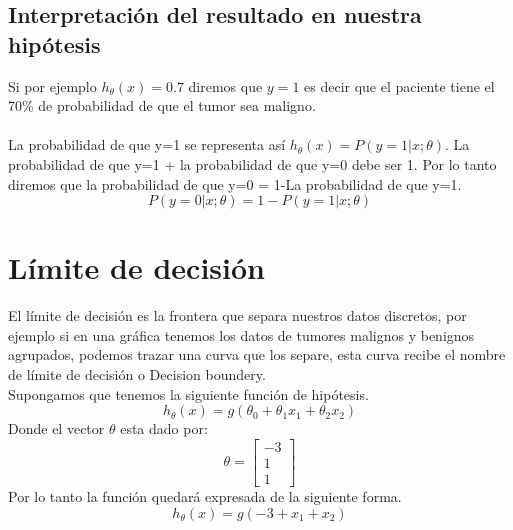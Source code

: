 \documentclass{report}
\begin{document}
\subsection{Interpretación del resultado en nuestra hipótesis}
Si por ejemplo $h_\theta(x)=0.7$ diremos que $ y=1 $ es decir que el paciente tiene el 70\% de probabilidad de que el tumor sea maligno.\\\\La probabilidad de que y=1 se representa así $ h_\theta(x)=P(y=1|x;\theta) $. La probabilidad de que y=1 + la probabilidad de que y=0 debe ser 1.  Por lo tanto diremos que la probabilidad de que y=0 = 1-La probabilidad de que y=1.
\begin{equation}
	P(y=0|x;\theta)=1-P(y=1|x;\theta)
\end{equation} 
\section{Límite de decisión}
El límite de decisión es la frontera que separa nuestros datos discretos, por ejemplo si en una gráfica tenemos los datos de tumores malignos y benignos agrupados, podemos trazar una curva que los separe, esta curva recibe el nombre de límite de decisión o Decision boundery.\\Supongamos que tenemos la siguiente función de hipótesis.
\begin{equation}
h_\theta(x)=g(\theta_0+\theta_1x_1+\theta_2x_2)
\label{Eq:HipLogistic}
\end{equation}
Donde el vector $ \theta $ esta dado por:
\[
\theta=\left[\begin{array}{c}
-3\\1\\1
\end{array}\right]
\]
 Por lo tanto la función quedará expresada de la siguiente forma. 
\[
h_\theta(x)=g(-3+x_1+x_2)
\]
\end{document}
